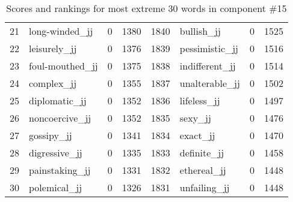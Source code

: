 \begin{table}[tbp]
\begin{tabular}{| rlr@{.}l | rlr@{.}l |}
    21 & long-winded\_jj & 0 & 1380    &    1840 & bullish\_jj & 0 & 1525 \\
    22 & leisurely\_jj & 0 & 1376    &    1839 & pessimistic\_jj & 0 & 1516 \\
    23 & foul-mouthed\_jj & 0 & 1375    &    1838 & indifferent\_jj & 0 & 1514 \\
    24 & complex\_jj & 0 & 1355    &    1837 & unalterable\_jj & 0 & 1502 \\
    25 & diplomatic\_jj & 0 & 1352    &    1836 & lifeless\_jj & 0 & 1497 \\
    26 & noncoercive\_jj & 0 & 1352    &    1835 & sexy\_jj & 0 & 1476 \\
    27 & gossipy\_jj & 0 & 1341    &    1834 & exact\_jj & 0 & 1470 \\
    28 & digressive\_jj & 0 & 1335    &    1833 & definite\_jj & 0 & 1458 \\
    29 & painstaking\_jj & 0 & 1331    &    1832 & ethereal\_jj & 0 & 1448 \\
    30 & polemical\_jj & 0 & 1326    &    1831 & unfailing\_jj & 0 & 1448 \\
    \hline
    \end{tabular}
    \caption{Scores and rankings for most extreme 30 words in component \#15} 
\end{table}
\clearpage
